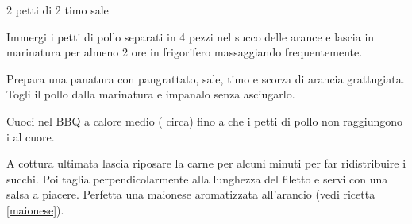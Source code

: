 \begin{ingreds}
	2 petti di 
	2 
	timo
	sale

\end{ingreds}

\begin{method}
Immergi i petti di pollo separati in 4 pezzi nel succo delle arance e lascia in marinatura per almeno 2 ore in frigorifero massaggiando frequentemente.

Prepara una panatura con pangrattato, sale, timo e scorza di arancia grattugiata. Togli il pollo dalla marinatura e impanalo senza asciugarlo.

Cuoci nel BBQ a calore medio ( circa) fino a che i petti di pollo non raggiungono i  al cuore.

A cottura ultimata lascia riposare la carne per alcuni minuti per far ridistribuire i succhi. Poi taglia perpendicolarmente alla lunghezza del filetto e servi con una salsa a piacere. Perfetta una maionese aromatizzata all'arancio (vedi ricetta \ref{maionese}).


\end{method}



